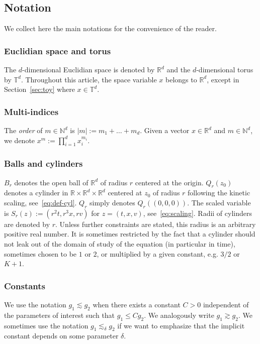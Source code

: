 \documentclass[10pt]{amsart}
\theoremstyle{definition}\newtheorem{defi}[theo]{Definition}\newtheorem{rema}[theo]{Remark}\newtheorem{exam}[theo]{Example}\newtheorem{exem}[theo]{Example}\newtheorem{nota}[theo]{Notation}
\newcommand{\N}{\mathbb{N}}
\newcommand{\R}{\mathbb{R}}
\newcommand{\T}{\mathbb{T}}
\begin{document}
\subsection{Notation}
We collect here the main notations for the convenience of the reader.

\subsubsection{Euclidian space and torus}
The $d$-dimensional Euclidian space is denoted by $\R^d$ and the $d$-dimensional torus by $\T^d$. Throughout this article, the space variable $x$ belongs to $\R^d$, except in Section~\ref{sec:toy} where $x \in \T^d$.

\subsubsection{Multi-indices}
The \emph{order} of $m \in \N^d$ is $|m| := m_1+\dots+m_d$. Given a vector $x \in \R^d$ and $m \in \N^d$, we denote $x^m := \prod_{i=1} ^d x_i^{m_i}$.

\subsubsection{Balls and cylinders}
$B_r$ denotes the open ball of $\R^d$ of radius $r$ centered at the origin. $Q_r(z_0)$ denotes a cylinder in $\R \times \R^d \times \R^d$ centered at $z_0$ of radius $r$ following the kinetic scaling, see~\eqref{eq:def-cyl}. $Q_r$ simply denotes $Q_r((0,0,0))$. The scaled variable is $S_r (z):=(r^2t,r^3x,rv)$ for $z=(t,x,v)$, see~\eqref{eq:scaling}. Radii of cylinders are denoted by $r$. Unless further constraints are stated, this radius is an arbitrary positive real number. It is sometimes restricted by the fact that a cylinder should not leak out of the domain of study of the equation (in particular in time), sometimes chosen to be $1$ or $2$, or multiplied by a given constant, e.g. $3/2$ or $K+1$.

\subsubsection{Constants}
We use the notation $g_1 \lesssim g_2$ when there exists a constant $C > 0$ independent of the parameters of interest such that $g_1 \leq C g_2$. We analogously write $g_1 \gtrsim g_2$. We sometimes use the notation $g_1 \lesssim_{\delta} g_2$ if we want to emphasize that the implicit constant depends on some parameter $\delta$.
\end{document}
